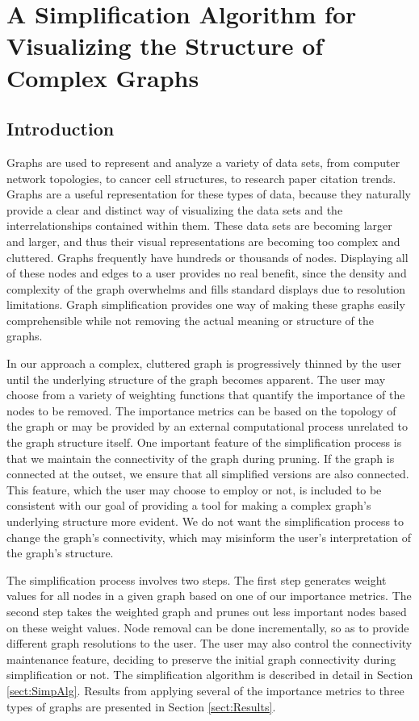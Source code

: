 \chapter{A Simplification Algorithm for Visualizing the Structure of Complex Graphs}
\label{chap:graph_simp}
\section{Introduction} 
Graphs are used to represent and analyze a variety of data sets, from computer network topologies, to cancer cell structures, to research paper citation trends.  Graphs are a useful representation for these types of data, because they naturally provide a clear and distinct way of visualizing the data sets and the interrelationships contained within them.  These data sets are becoming larger and larger, and thus their visual representations are becoming too complex and cluttered.  Graphs frequently have hundreds or thousands of nodes.  Displaying all of these nodes and edges to a user provides no real benefit, since the density and complexity of the graph overwhelms and fills standard displays due to resolution limitations.  Graph simplification provides one way of making these graphs easily comprehensible while not removing the actual meaning or structure of the graphs.

In our approach a complex, cluttered graph is progressively thinned by the user until the underlying structure of the graph becomes apparent.  The user may choose from a variety of weighting functions that quantify the importance of the nodes to be removed.  The importance metrics can be based on the topology of the graph or may be provided by an external computational process unrelated to the graph structure itself.  One important feature of the simplification process is that we maintain the connectivity of the graph during pruning.  If the graph is connected at the outset, we ensure that all simplified versions are also connected.  This feature, which the user may choose to employ or not, is included to be consistent with our goal of providing a tool for making a complex graph's underlying structure more evident.  We do not want the simplification process to change the graph's connectivity, which may misinform the user's interpretation of the graph's structure.

The simplification process involves two steps.  The first step generates weight values for all nodes in a given graph based on one of our importance metrics.  The second step takes the weighted graph and prunes out less important nodes based on these weight values.  Node removal can be done incrementally, so as to provide different graph resolutions to the user.  The user may also control the connectivity maintenance feature, deciding to preserve the initial graph connectivity during simplification or not.  The simplification algorithm is described in detail in Section \ref{sect:SimpAlg}. Results from applying several of the importance metrics to three types of graphs are presented in Section \ref{sect:Results}.

